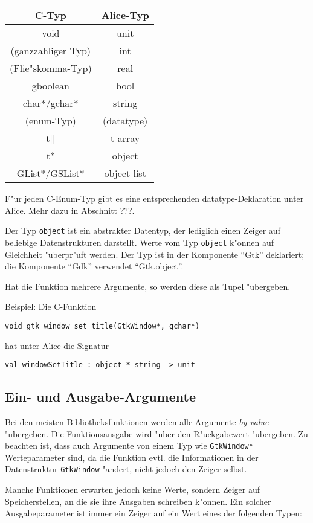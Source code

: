 \documentclass{article}
\begin{document}
\begin{tabular}{|c|c|}
\hline \textbf{C-Typ}     & \textbf{Alice-Typ} \\
\hline void               & unit       \\
\hline (ganzzahliger Typ) & int        \\
\hline (Flie"skomma-Typ)  & real       \\
\hline gboolean           & bool       \\
\hline char*/gchar*       & string     \\
\hline (enum-Typ)         & (datatype) \\
\hline t[]                & t array    \\
\hline t*                 & object     \\
\hline GList*/GSList*     & object list\\
\hline
\end{tabular}

F"ur jeden C-Enum-Typ gibt es eine entsprechenden datatype-Deklaration
unter Alice. Mehr dazu in Abschnitt ???.

Der Typ \texttt{object} ist ein abstrakter Datentyp, der lediglich einen
Zeiger auf beliebige Datenstrukturen darstellt. Werte vom Typ \texttt{object}
k"onnen auf Gleichheit "uberpr"uft werden. Der Typ ist in der Komponente 
``Gtk'' deklariert; die Komponente ``Gdk'' verwendet ``Gtk.object''.

Hat die Funktion mehrere Argumente, so werden diese als Tupel "ubergeben.

Beispiel: Die C-Funktion
 
\texttt{void gtk\_window\_set\_title(GtkWindow*, gchar*)}

hat unter Alice die Signatur

\texttt{val windowSetTitle : object * string -> unit}

\subsection{Ein- und Ausgabe-Argumente}

Bei den meisten Bibliotheksfunktionen werden alle Argumente \textit{by value}
"ubergeben. Die Funktionsausgabe wird "uber den R"uckgabewert "ubergeben.
Zu beachten ist, dass auch Argumente von einem Typ wie \texttt{GtkWindow*}
Werteparameter sind, da die Funktion evtl. die Informationen in der
Datenstruktur \texttt{GtkWindow} "andert, nicht jedoch den Zeiger selbst.

Manche Funktionen erwarten jedoch keine Werte, sondern Zeiger auf
Speicherstellen, an die sie ihre Ausgaben schreiben k"onnen. Ein solcher
Ausgabeparameter ist immer ein Zeiger auf ein Wert eines der folgenden Typen:
\end{document}
